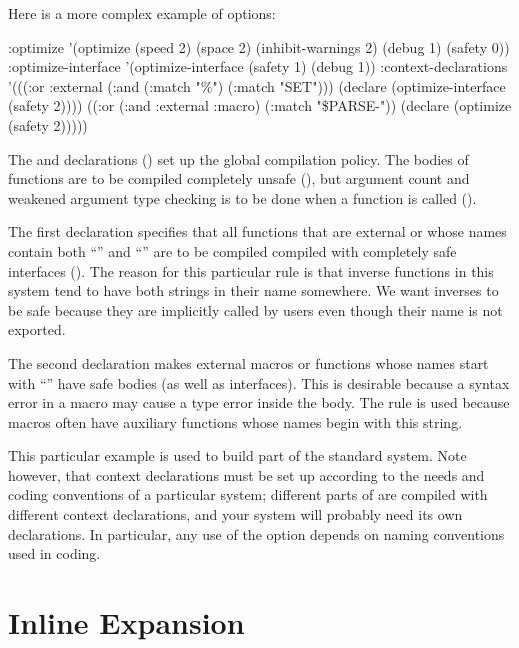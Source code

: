 Here is a more complex example of  options:
\begin{example}
:optimize '(optimize (speed 2) (space 2) (inhibit-warnings 2)
                     (debug 1) (safety 0))
:optimize-interface '(optimize-interface (safety 1) (debug 1))
:context-declarations
'(((:or :external (:and (:match "\%") (:match "SET")))
   (declare (optimize-interface (safety 2))))
  ((:or (:and :external :macro)
        (:match "\$PARSE-"))
   (declare (optimize (safety 2)))))
\end{example}
The  and 
declarations () set up the global
compilation policy.  The bodies of functions are to be compiled
completely unsafe (), but argument count and weakened
argument type checking is to be done when a function is called
().

The first declaration specifies that all functions that are external
or whose names contain both ``\code{\%}'' and ``'' are to be
compiled compiled with completely safe interfaces ().
The reason for this particular  rule is that 
inverse functions in this system tend to have both strings in their
name somewhere.  We want  inverses to be safe because they
are implicitly called by users even though their name is not exported.

The second declaration makes external macros or functions whose names
start with ``'' have safe bodies (as well as interfaces).
This is desirable because a syntax error in a macro may cause a type
error inside the body.  The  rule is used because macros
often have auxiliary functions whose names begin with this string.

This particular example is used to build part of the standard \cmucl{}
system.  Note however, that context declarations must be set up
according to the needs and coding conventions of a particular system;
different parts of \cmucl{} are compiled with different context
declarations, and your system will probably need its own declarations.
In particular, any use of the  option depends on naming
conventions used in coding.


\section{Inline Expansion}
\label{inline-expansion}

